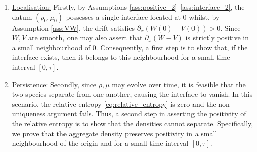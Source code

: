 \documentclass[a4paper,twosided, 11pt]{article}
\theoremstyle{plain}
\theoremstyle{remark}
\numberwithin{equation}{section}
\begin{document}
\medskip 

\begin{enumerate}
    \item \underline{Localisation:} Firstly, by Assumptions \ref{ass:positive_2}--\ref{ass:interface_2}, the datum $(\rho_0,\mu_0)$ possesses a single interface located at $0$ whilst, by Assumption \ref{ass:VW}, the drift satisfies $\partial_x(W(0)-V(0)) > 0$. 
    Since $W,V$ are smooth, one may also assert that $\partial_x(W-V)$ is strictly positive in a small neighbourhood of $0$.
    Consequently, a first step is to show that, if the interface exists, then it belongs to this neighbourhood for a small time interval $[0,\tau]$. 

    \item \underline{Persistence:} Secondly, since $\rho,\mu$ may evolve over time, it is feasible that the two species separate from one another, causing the interface to vanish. 
    In this scenario, the relative entropy \eqref{eq:relative_entropy} is zero and the non-uniqueness argument fails. 
    Thus, a second step in asserting the positivity of the relative entropy is to show that the densities cannot separate. 
    Specifically, we prove that the aggregate density preserves positivity in a small neighbourhood of the origin and for a small time interval $[0,\tau]$.
\end{enumerate}
\end{document}
